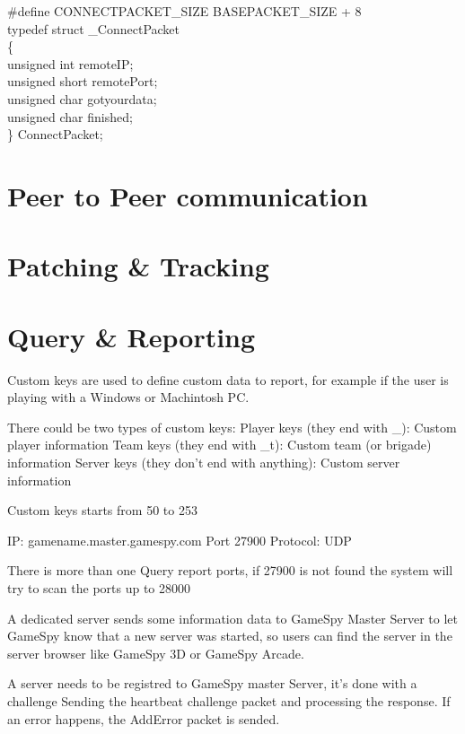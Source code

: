 \documentclass[oneside,titlepage,a4paper]{Definition/retrospy} %
\begin{document}
\begin{mybox}
	\#define CONNECTPACKET\_SIZE BASEPACKET\_SIZE + 8\\
	typedef struct \_ConnectPacket\\
	\{\\
	unsigned int remoteIP;\\
	unsigned short remotePort;\\
	unsigned char gotyourdata;\\
	unsigned char finished;\\
	\} ConnectPacket;\\
\end{mybox}













\part{Peer to Peer communication}
\part{Patching \& Tracking}
\part{Query \& Reporting}
Custom keys are used to define custom data to report, for example if the user is playing with a
Windows or Machintosh PC.

There could be two types of custom keys:
Player keys (they end with \_):
Custom player information
Team keys (they end with \_t):
Custom team (or brigade) information
Server keys (they don't end with anything):
Custom server information

Custom keys starts from 50 to 253


IP: gamename.master.gamespy.com
Port 27900
Protocol: UDP

There is more than one Query report ports, if 27900 is not found the system will 
try to scan the ports up to 28000

A dedicated server sends some information data to GameSpy Master Server to let GameSpy know
that a new server was started, so users can find the server in the server browser
like GameSpy 3D or GameSpy Arcade.

A server needs to be registred to GameSpy master Server, it's done with a challenge
Sending the heartbeat challenge packet and processing the response.
If an error happens, the AddError packet is sended.
\end{document}
